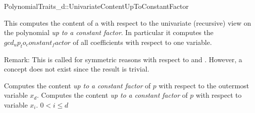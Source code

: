 \begin{ccRefConcept}{PolynomialTraits_d::UnivariateContentUpToConstantFactor}

\ccDefinition

This  computes the content of a 
with respect to the univariate (recursive) view on the 
polynomial {\em up to  a constant factor}. 
In particular it computes the $gcd_up_to_constant_factor$ of all 
coefficients  with respect to one variable. 

Remark: This is called  for 
symmetric reasons with respect to  
and . 
However, a concept  does not exist
since the result is trivial. 
 
\ccRefines 
{}

\ccTypes

\ccGlue
{}\ccGlue
{}

\ccOperations
{}
         {Computes the content {\em up to  a constant factor} of $p$ with 
          respect to the outermost variable $x_d$. }
         {Computes the content {\em up to  a constant factor} of $p$ with 
          respect to variable $x_i$. 
          \ccPrecond $0<i \leq d$
         }


\ccSeeAlso

\\
\\

\end{ccRefConcept}
